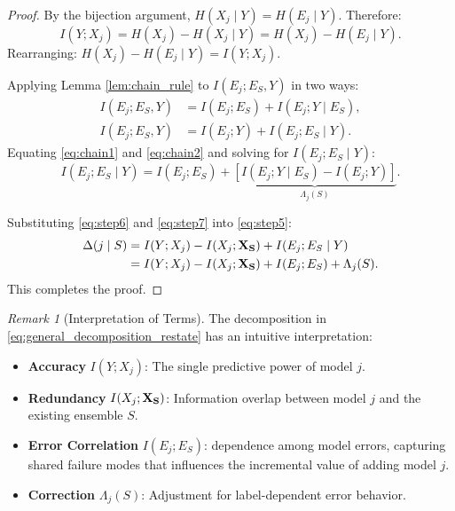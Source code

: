 \documentclass{article}
\theoremstyle{plain}
\theoremstyle{definition}
\theoremstyle{remark}
\newtheorem{remark}[theorem]{Remark}
\begin{document}
\begin{proof}
By the bijection argument, $H(X_j \mid Y) = H(E_j \mid Y)$. Therefore:
\begin{equation}
\label{eq:step6}
    I(Y; X_j) = H(X_j) - H(X_j \mid Y) = H(X_j) - H(E_j \mid Y).
\end{equation}
Rearranging: $H(X_j) - H(E_j \mid Y) = I(Y; X_j)$.


Applying Lemma \ref{lem:chain_rule} to $I(E_j; E_S, Y)$ in two ways:
\begin{align}
    I(E_j; E_S, Y) &= I(E_j; E_S) + I(E_j; Y \mid E_S), \label{eq:chain1} \\
    I(E_j; E_S, Y) &= I(E_j; Y) + I(E_j; E_S \mid Y). \label{eq:chain2}
\end{align}
Equating \cref{eq:chain1} and \cref{eq:chain2} and solving for $I(E_j; E_S \mid Y)$:
\begin{equation}
\label{eq:step7}
    I(E_j; E_S \mid Y) = I(E_j; E_S) + \underbrace{\left[ I(E_j; Y \mid E_S) - I(E_j; Y) \right]}_{\Lambda_j(S)}.
\end{equation}


Substituting \cref{eq:step6} and \cref{eq:step7} into \cref{eq:step5}:
\begin{align}
    \Delta(j \mid S) &= I(Y; X_j) - I(X_j; {\bf X_S}) + I(E_j; E_S \mid Y) \\
    &= I(Y; X_j) - I(X_j; {\bf X_S}) + I(E_j; E_S) + \Lambda_j(S).
\end{align}
This completes the proof.
\end{proof}

\begin{remark}[Interpretation of Terms]
\label{rem:interpretation}
The decomposition in \cref{eq:general_decomposition_restate} has an intuitive interpretation:
\begin{itemize}
    \item \textbf{Accuracy} $I(Y; X_j)$: The single predictive power of model $j$.
    \item \textbf{Redundancy} $I(X_j; {\bf X_S})$: Information overlap between model $j$ and the existing ensemble $S$.
    \item \textbf{Error Correlation} $I(E_j; E_S)$: dependence among model errors, capturing
shared failure modes that influences the incremental value of adding model $j$.

    \item \textbf{Correction} $\Lambda_j(S)$: Adjustment for label-dependent error behavior.
\end{itemize}
\end{remark}
\end{document}
